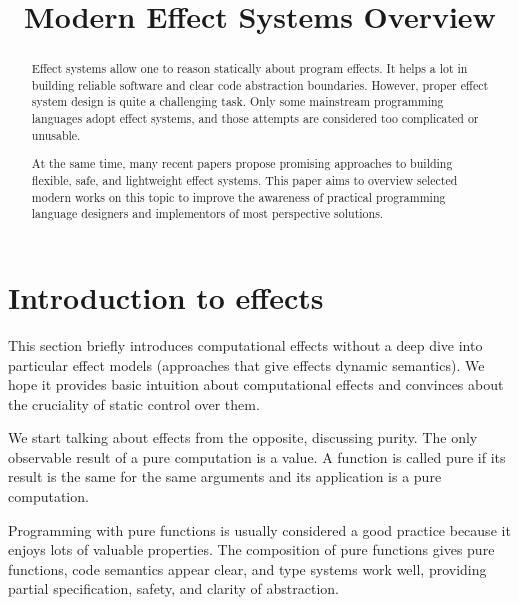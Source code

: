 \documentclass[conference]{IEEEtran}
\begin{document}
    \title{Modern Effect Systems Overview
    }

    \author{
    }


    \maketitle
    \thispagestyle{firststyle}


    \begin{abstract}
        Effect systems allow one to reason statically about program effects.
        It helps a lot in building reliable software and clear code abstraction boundaries.
        However, proper effect system design is quite a challenging task.
        Only some mainstream programming languages adopt effect systems, and those attempts are considered too complicated or unusable.

        At the same time, many recent papers propose promising approaches to building flexible, safe, and lightweight effect systems.
        This paper aims to overview selected modern works on this topic to improve the awareness of practical programming language designers and implementors of most perspective solutions.
    \end{abstract}


    \section{Introduction to effects}

    This section briefly introduces computational effects without a deep dive into particular effect models (approaches that give effects dynamic semantics).
    We hope it provides basic intuition about computational effects and convinces about the cruciality of static control over them.

    We start talking about effects from the opposite, discussing purity.
    The only observable result of a pure computation is a value.
    A function is called pure if its result is the same for the same arguments and its application is a pure computation.

    Programming with pure functions is usually considered a good practice because it enjoys lots of valuable properties.
    The composition of pure functions gives pure functions, code semantics appear clear, and type systems work well, providing partial specification, safety, and clarity of abstraction.
\end{document}
